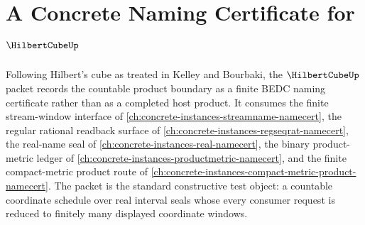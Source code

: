 \chapter{A Concrete Naming Certificate for $\HilbertCubeUp$}
\label{ch:concrete-instances-hilbert-cube-namecert}

Following Hilbert's cube as treated in Kelley and Bourbaki, the $\HilbertCubeUp$ packet records the countable product boundary as a finite BEDC naming certificate rather than as a completed host product. It consumes the finite stream-window interface of \autoref{ch:concrete-instances-streamname-namecert}, the regular rational readback surface of \autoref{ch:concrete-instances-regseqrat-namecert}, the real-name seal of \autoref{ch:concrete-instances-real-namecert}, the binary product-metric ledger of \autoref{ch:concrete-instances-productmetric-namecert}, and the finite compact-metric product route of \autoref{ch:concrete-instances-compact-metric-product-namecert}. The packet is the standard constructive test object: a countable coordinate schedule over real interval seals whose every consumer request is reduced to finitely many displayed coordinate windows.

